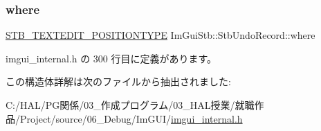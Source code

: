 \subsubsection{\texorpdfstring{where}{where}}
{\footnotesize\ttfamily \mbox{\hyperlink{stb__textedit_8h_a5d0c1b8751b6517e3d817f2a025ed654}{S\+T\+B\+\_\+\+T\+E\+X\+T\+E\+D\+I\+T\+\_\+\+P\+O\+S\+I\+T\+I\+O\+N\+T\+Y\+PE}} Im\+Gui\+Stb\+::\+Stb\+Undo\+Record\+::where}



 imgui\+\_\+internal.\+h の 300 行目に定義があります。



この構造体詳解は次のファイルから抽出されました\+:\begin{DoxyCompactItemize}
\item 
C\+:/\+H\+A\+L/\+P\+G関係/03\+\_\+作成プログラム/03\+\_\+\+H\+A\+L授業/就職作品/\+Project/source/06\+\_\+\+Debug/\+Im\+G\+U\+I/\mbox{\hyperlink{imgui__internal_8h}{imgui\+\_\+internal.\+h}}\end{DoxyCompactItemize}
